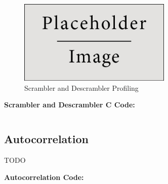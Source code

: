 \documentclass{article}
\begin{document}
\begin{figure}[h]
  \begin{center}
    \includegraphics[width=0.65\textwidth]{img/placeholder.jpg}
    \caption{Scrambler and Descrambler Profiling}
  \end{center}
\end{figure}


\textbf{Scrambler and Descrambler C Code:}

\begin{verbatim}
\end{verbatim}

\subsection{Autocorrelation}
TODO

\textbf{Autocorrelation Code:}

\begin{verbatim}
\end{verbatim}
\end{document}
